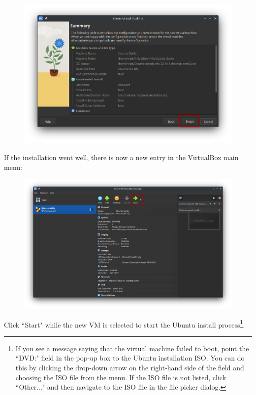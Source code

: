 \documentclass[12pt]{article}
\begin{document}
\begin{figure}[htp]
    \centering
    \includegraphics[width=\textwidth]{1-8.png}
\end{figure}

\pagebreak

If the installation went well, there is now a new entry in the VirtualBox main menu: 

\begin{figure}[htp]
    \centering
    \includegraphics[width=\textwidth]{1-9.png}
\end{figure}

Click ``Start" while the new VM is selected to start the Ubuntu install process\footnote{If you see a message saying that the virtual machine failed to boot, point the ``DVD:" field in the pop-up box to the Ubuntu installation ISO. You can do this by clicking the drop-down arrow on the right-hand side of the field and choosing the ISO file from the menu. If the ISO file is not listed, click ``Other..." and then navigate to the ISO file in the file picker dialog.}.
\end{document}
